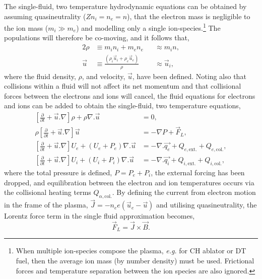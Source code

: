 The single-fluid, two temperature hydrodynamic equations can be obtained by assuming quasineutrality ($Z n_i = n_e = n$), that the electron mass is negligible to the ion mass ($m_i \gg m_e$) and modelling only a single ion-species.\footnote{When multiple ion-species compose the plasma, \textit{e.g.} for CH ablator or DT fuel, then the average ion mass (by number density) must be used. Frictional forces and temperature separation between the ion species are also ignored.}
The populations will therefore be co-moving, and it follows that,
\begin{alignat}{2}
    \rho &\equiv m_i n_i + m_e n_e &&\approx m_i n,\\
    \vec{u} &\equiv \frac{(\rho_i \vec{u}_i + \rho_e \vec{u}_e)}{\rho} &&\approx \vec{u}_i,
\end{alignat}
where the fluid density, $\rho$, and velocity, $\vec{u}$, have been defined.
Noting also that collisions within a fluid will not affect its net momentum and that collisional forces between the electrons and ions will cancel, the fluid equations for electrons and ions can be added to obtain the single-fluid, two temperature equations,
\begin{align}
    \label{eq:theory_singlefluid_eqs_1}
    \left [ \frac{\partial}{\partial t} + \vec{u}.\nabla \right ] \rho + \rho\nabla . \vec{u} &= 0,\\
    \label{eq:theory_singlefluid_eqs_2}
    \rho \left [ \frac{\partial}{\partial t} + \vec{u}.\nabla \right ] \vec{u} &= -\nabla P + \vec{F}_{L},\\
    \label{eq:theory_singlefluid_eqs_3}
    \left [ \frac{\partial}{\partial t} + \vec{u}.\nabla \right ] U_e + (U_e + P_e)\nabla.\vec{u} &= -\nabla . \vec{q_e} + Q_{e,\text{ext.}} + Q_{e,\text{col.}},\\
    \label{eq:theory_singlefluid_eqs_4}
    \left [ \frac{\partial}{\partial t} + \vec{u}.\nabla \right ] U_i + (U_i + P_i)\nabla.\vec{u} &= -\nabla . \vec{q_i} + Q_{i,\text{ext.}} + Q_{i,\text{col.}},
\end{align}
where the total pressure is defined, $P=P_e+P_i$, the external forcing has been dropped, and equilibration between the electron and ion temperatures occurs via the collisional heating terms $Q_{\alpha,\text{col.}}$.
By defining the current from electron motion in the frame of the plasma, $\vec{J}=-n_e e (\vec{u}_e - \vec{u})$ and utilising quasineutrality, the Lorentz force term in the single fluid approximation becomes,
\begin{equation}
    \label{eq:theory_lorentz_force}
    \vec{F}_{L} = \vec{J}\times\vec{B}.
\end{equation}
